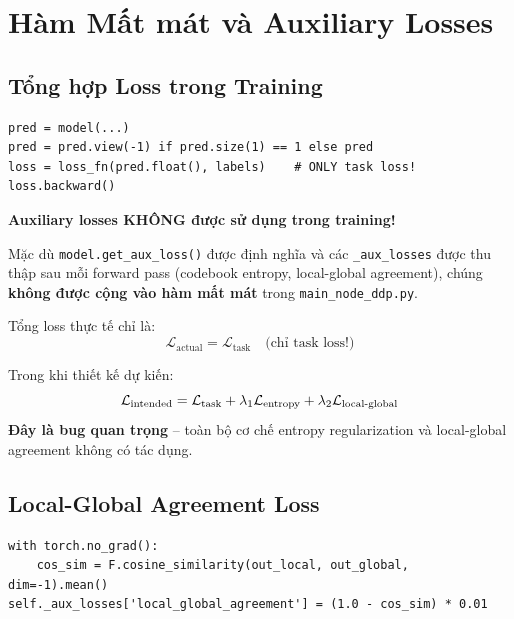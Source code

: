 \documentclass[12pt,a4paper]{article}
\begin{document}
\section{Hàm Mất mát và Auxiliary Losses}

\subsection{Tổng hợp Loss trong Training}

\begin{codebox}[title={main\_node\_ddp.py -- training loop (rút gọn)}]
\begin{lstlisting}
pred = model(...)
pred = pred.view(-1) if pred.size(1) == 1 else pred
loss = loss_fn(pred.float(), labels)    # ONLY task loss!
loss.backward()
\end{lstlisting}
\end{codebox}

\begin{issuebox}
\textbf{Auxiliary losses KHÔNG được sử dụng trong training!}

Mặc dù \texttt{model.get\_aux\_loss()} được định nghĩa và các
\texttt{\_aux\_losses} được thu thập sau mỗi forward pass (codebook entropy,
local-global agreement), chúng \textbf{không được cộng vào hàm mất mát}
trong \texttt{main\_node\_ddp.py}.

Tổng loss thực tế chỉ là:
\begin{equation}
  \mathcal{L}_\text{actual} = \mathcal{L}_\text{task}
  \quad \text{(chỉ task loss!)}
\end{equation}

Trong khi thiết kế dự kiến:
\begin{equation}
  \mathcal{L}_\text{intended} = \mathcal{L}_\text{task}
    + \lambda_1 \mathcal{L}_\text{entropy}
    + \lambda_2 \mathcal{L}_\text{local\text{-}global}
\end{equation}
\textbf{Đây là bug quan trọng} -- toàn bộ cơ chế entropy regularization
và local-global agreement không có tác dụng.
\end{issuebox}

\subsection{Local-Global Agreement Loss}

\begin{codebox}[title={model.py -- RelGTLayer.forward() -- full mode}]
\begin{lstlisting}
with torch.no_grad():
    cos_sim = F.cosine_similarity(out_local, out_global, dim=-1).mean()
self._aux_losses['local_global_agreement'] = (1.0 - cos_sim) * 0.01
\end{lstlisting}
\end{codebox}
\end{document}
